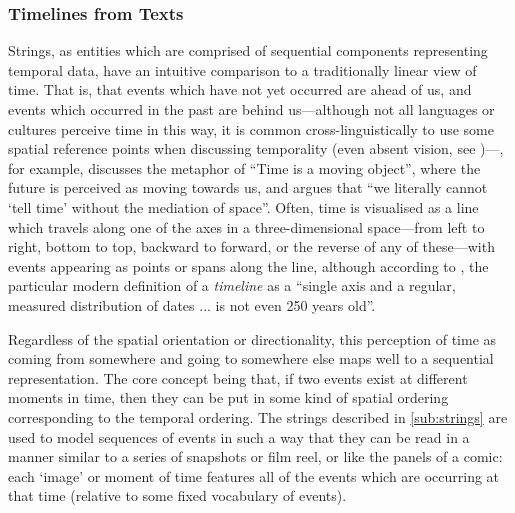 \documentclass[a4paper,12pt,leqno,twoside]{article}
\newcommand{\nb}[1]{{\color{red}[NB\footnote{{\color{red}#1}}]}}
\begin{document}
\subsubsection{Timelines from Texts}\label{ssub:timelines}
Strings, as entities which are comprised of sequential components representing temporal data, have an intuitive comparison to a traditionally linear view of time. That is, that events which have not yet occurred are ahead of us, and events which occurred in the past are behind us---although not all languages or cultures perceive time in this way, it is common cross-linguistically to use some spatial reference points when discussing temporality
(even absent vision, see \citet{bottini2015space})---\citet[pp. 42--43]{lakoff2008metaphors}, for example, discusses the metaphor of ``Time is a moving object'', where the future is perceived as moving towards us, and \citet[p. 542]{mitchell1980spatial} argues that ``we literally cannot `tell time' without the mediation of space''. Often, time is visualised as a line which travels along one of the axes in a three-dimensional space---from left to right, bottom to top, backward to forward, or the reverse of any of these---with events appearing as points or spans along the line, although according to \citet[p. 14]{rosenberg2013cartographies}, the particular modern definition of a \textit{timeline} as a ``single axis and a regular, measured distribution of dates ... is not even 250 years old''.

Regardless of the spatial orientation or directionality, this perception of time as coming from somewhere and going to somewhere else maps well to a sequential representation. The core concept being that, if two events exist at different moments in time, then they can be put in some kind of spatial ordering corresponding to the temporal ordering. The strings described in \cref{sub:strings} are used to model sequences of events in such a way that they can be read in a manner similar to a series of snapshots or film reel, or like the panels of a comic: each `image' or moment of time features all of the events which are occurring at that time (relative to some fixed vocabulary of events).
\end{document}
